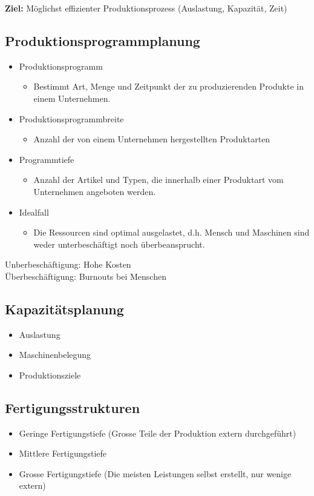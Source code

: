 \documentclass[../ZF_Wing.tex]{subfiles}
\begin{document}
\textbf{Ziel:} Möglichst effizienter Produktionsprozess (Auslastung, Kapazität, Zeit)
\subsection{Produktionsprogrammplanung}
\begin{itemize}
	\item Produktionsprogramm
	\begin{itemize}
		\item Bestimmt Art, Menge und Zeitpunkt der zu produzierenden Produkte in einem Unternehmen.
	\end{itemize}
	\item Produktionsprogrammbreite
	\begin{itemize}
		\item Anzahl der von einem Unternehmen hergestellten Produktarten
	\end{itemize}
	\item Programmtiefe
	\begin{itemize}
		\item Anzahl der Artikel und Typen, die innerhalb einer Produktart vom Unternehmen angeboten werden.
	\end{itemize}
	\item Idealfall
	\begin{itemize}
		\item Die Ressourcen sind optimal ausgelastet, d.h. Mensch und Maschinen sind weder unterbeschäftigt noch überbeansprucht.
	\end{itemize}
\end{itemize}
Unberbeschäftigung: Hohe Kosten\\
Überbeschäftigung: Burnouts bei Menschen\\

\subsection{Kapazitätsplanung}
\begin{itemize}
	\item Auslastung
	\item Maschinenbelegung
	\item  Produktionsziele
\end{itemize}
\subsection{Fertigungsstrukturen}
\begin{itemize}
	\item Geringe Fertigungstiefe (Grosse Teile der Produktion extern durchgeführt)
	\item Mittlere Fertigungstiefe
	\item Grosse Fertigungstiefe (Die meisten Leistungen selbst erstellt, nur wenige extern)
\end{itemize}
\end{document}
